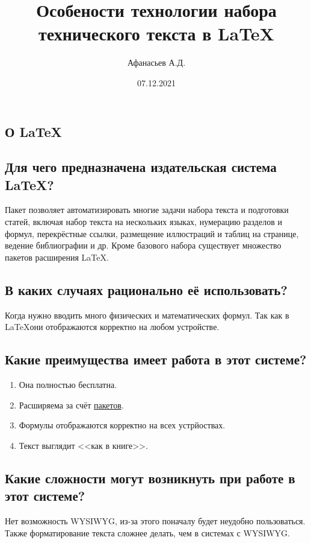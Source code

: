 \documentclass[a4paper,12pt]{article} %
\author{Афанасьев А.Д.}
\title{Особености технологии набора технического текста в \LaTeX{}}
\date{07.12.2021}
\begin{document}
\maketitle
\newpage
\begin{center}
\section{О \LaTeX}
\end{center}
\subsection{Для чего предназначена издательская система \LaTeX?}
Пакет позволяет автоматизировать многие задачи набора текста и подготовки статей, включая набор текста на нескольких языках, нумерацию разделов и формул, перекрёстные ссылки, размещение иллюстраций и таблиц на странице, ведение библиографии и др. Кроме базового набора существует множество пакетов расширения \LaTeX.
\subsection{В каких случаях рационально её использовать?}
\begin{flushright}
Когда нужно вводить много физических и математических формул. Так как в \LaTeX они отображаются корректно на любом устройстве.
\end{flushright}
\subsection{Какие преимущества имеет работа в этот системе?}
\begin{flushleft}
\begin{enumerate}
\item Она {\Large полностью бесплатна}.
\item Расширяема за счёт \href{https://www.ctan.org/pkg}{пакетов}.
\item Формулы отображаются корректно на всех устрйоствах.
\item Текст выглядит <<как в книге>>.
\end{enumerate}
\end{flushleft}
\subsection{Какие сложности могут возникнуть при работе в этот системе?}
Нет возможность WYSIWYG, из-за этого поначалу будет неудобно пользоваться. Также форматирование текста сложнее делать, чем в системах с WYSIWYG.
\end{document}
